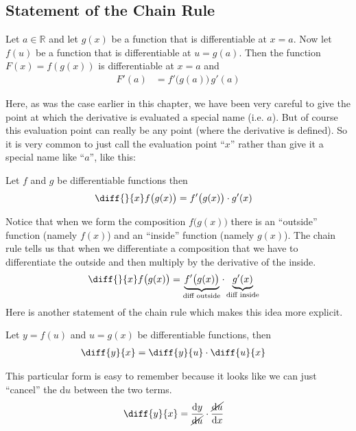 \subsection*{Statement of the Chain Rule}

\begin{theorem}
\label{thm:DIFFchainRuleV1}
  Let $a \in \mathbb{R}$ and let $g(x)$ be a function that is differentiable at
$x=a$. Now let $f(u)$ be a function that is differentiable at
$u=g(a)$. Then the function $F(x) = f(g(x))$ is differentiable at $x=a$ and
\begin{align*}
  F'(a) &=f'\big(g(a)\big)\,g'(a)
\end{align*}
\end{theorem}
Here, as was the case earlier in this chapter,  we have been very
careful to give the point at which the derivative is evaluated a special
name (i.e. $a$). But of course this evaluation point can really be
any point (where the derivative is defined).
So it is very common to just call the evaluation point ``$x$'' rather
than give it a special name like ``$a$'', like this:
\begin{theorem}
\label{thm:DIFFchainRuleV2}
 Let $f$ and $g$ be differentiable functions then
  \begin{align*}
  \diff{}{x} f\big( g( x) \big) &= f'\big(g(x)\big) \cdot g'(x)
\end{align*}
\end{theorem}
Notice that when we form the composition $f\big(g(x)\big)$ there
is an ``outside'' function (namely $f(x)$) and an ``inside'' function
(namely $g(x)$). The chain rule tells us that when we differentiate
a composition that we have to differentiate the outside and then
multiply by the derivative of the inside.
\begin{align*}
  \diff{}{x} f\big( g( x) \big)
   &= \underbrace{f'\big(g(x)\big)}_\text{diff outside} \cdot
                          \underbrace{g'(x)}_\text{diff inside}
\end{align*}
Here is another statement of the chain rule which makes this idea more
explicit.


\begin{theorem}
\label{thm:DIFFchainRuleV3}
  Let $y = f(u)$ and $u = g(x)$ be differentiable functions, then
  \begin{align*}
  \diff{y}{x} &= \diff{y}{u} \cdot \diff{u}{x}
\end{align*}
\end{theorem}
This particular form is easy to remember because it looks like we can just
``cancel'' the $\mathrm{d}u$ between the two terms.
  \begin{align*}
  \diff{y}{x} &= \frac{\mathrm{d}{y}}{\cancel{\mathrm{d}u}} \cdot
\frac{\cancel{\mathrm{d}{u}}}{\mathrm{d}x}
\end{align*}

